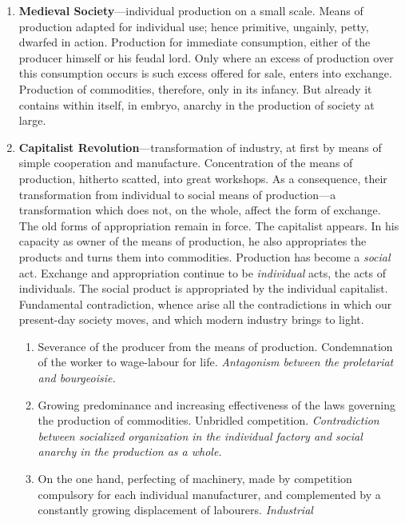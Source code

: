 \begin{enumerate}[label=\textbf{\arabic*.}]
  \item{
    \textbf{Medieval Society}---individual production on a small scale. Means of
    production adapted for individual use; hence primitive, ungainly, petty,
    dwarfed in action. Production for immediate consumption, either of the
    producer himself or his feudal lord. Only where an excess of production over
    this consumption occurs is such excess offered for sale, enters into
    exchange. Production of commodities, therefore, only in its infancy. But
    already it contains within itself, in embryo, anarchy in the production of
    society at large.
  }
  \item{
    \textbf{Capitalist Revolution}---transformation of industry, at first by
    means of simple cooperation and manufacture. Concentration of the means of
    production, hitherto scatted, into great workshops. As a consequence, their
    transformation from individual to social means of production---a
    transformation which does not, on the whole, affect the form of exchange.
    The old forms of appropriation remain in force. The capitalist appears. In
    his capacity as owner of the means of production, he also appropriates the
    products and turns them into commodities. Production has become a
    \emph{social} act. Exchange and appropriation continue to be
    \emph{individual} acts, the acts of individuals. The social product is
    appropriated by the individual capitalist. Fundamental contradiction, whence
    arise all the contradictions in which our present-day society moves, and
    which modern industry brings to light.
    \begin{enumerate}
      \item{
        Severance of the producer from the means of production. Condemnation of
        the worker to wage-labour for life. \emph{Antagonism between the
        proletariat and bourgeoisie.}
       }
       \item{
         Growing predominance and increasing effectiveness of the laws governing
         the production of commodities. Unbridled competition.
         \emph{Contradiction between socialized organization in the individual
         factory and social anarchy in the production as a whole.}
       }
       \item{
         On the one hand, perfecting of machinery, made by competition
         compulsory for each individual manufacturer, and complemented by a
         constantly growing displacement of labourers. \emph{Industrial
}}
\end{enumerate}}
\end{enumerate}
